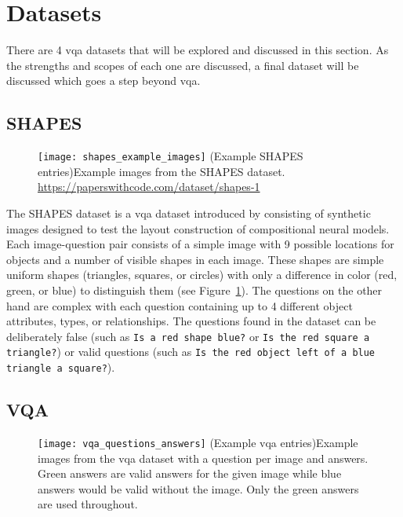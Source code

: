 \graphicspath{{content/chapters/literature_review/datasets/figures}}

\section{Datasets}
\label{sec:datasets}

There are 4 \gls{vqa} datasets that will be explored and discussed in this section. As the strengths and scopes of each one are discussed, a final dataset will be discussed which goes a step beyond \gls{vqa}.

\subsection{SHAPES}
\label{subsec:shapes_dataset}

\begin{figure}[htbp]
    \centering
    \texttt{[image: shapes\_example\_images]}
    \captionsource(Example SHAPES entries){Example images from the SHAPES dataset. \label{fig:shapes_example_images}}{\url{https://paperswithcode.com/dataset/shapes-1}}
\end{figure}

The SHAPES dataset is a \gls{vqa} dataset introduced by \citeauthor{andreas_deep_2016} \cite{andreas_deep_2016} consisting of synthetic images designed to test the layout construction of compositional neural models.
Each image-question pair consists of a simple image with 9 possible locations for objects and a number of visible shapes in each image.
These shapes are simple uniform shapes (triangles, squares, or circles) with only a difference in color  (red, green, or blue) to distinguish them (see Figure~\ref{fig:shapes_example_images}).
The questions on the other hand are complex with each question containing up to 4 different object attributes, types, or relationships.
The questions found in the dataset can be deliberately false (such as \texttt{Is a red shape blue?} or \texttt{Is the red square a triangle?}) or valid questions (such as \texttt{Is the red object left of a blue triangle a square?}).

\subsection{VQA}
\label{subsec:vqa_dataset}

\begin{figure}[htbp]
    \centering
    \texttt{[image: vqa\_questions\_answers]}
    \captionsource(Example \acrshort{vqa} entries){Example images from the \acrshort{vqa} dataset with a question per image and answers. Green answers are valid answers for the given image while blue answers would be valid without the image. Only the green answers are used throughout. \label{fig:vqa_questions_answers}}{\citeauthor{agrawal_vqa_2016}\cite{agrawal_vqa_2016}}
\end{figure}


